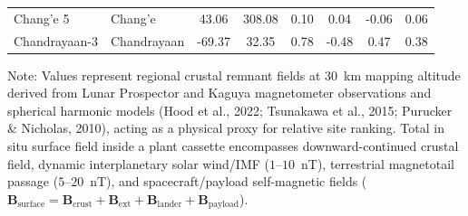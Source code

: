\begin{table}[t]
\begin{tabular*}{\textwidth}{@{\extracolsep\fill}llcccccc@{}}
\raggedright\footnotesize Chang'e 5 & \footnotesize Chang'e & \footnotesize 43.06 & \footnotesize 308.08 & \footnotesize 0.10 & \footnotesize 0.04 & \footnotesize -0.06 & \footnotesize 0.06 \\
\raggedright\footnotesize Chandrayaan-3 & \footnotesize Chandrayaan & \footnotesize -69.37 & \footnotesize 32.35 & \footnotesize 0.78 & \footnotesize -0.48 & \footnotesize 0.47 & \footnotesize 0.38 \\
\bottomrule
\end{tabular*}
\begin{tablenotes}
\item Note: Values represent regional crustal remnant fields at 30~km mapping altitude derived from Lunar Prospector and Kaguya magnetometer observations and spherical harmonic models (Hood et al., 2022; Tsunakawa et al., 2015; Purucker \& Nicholas, 2010), acting as a physical proxy for relative site ranking. Total in situ surface field inside a plant cassette encompasses downward-continued crustal field, dynamic interplanetary solar wind/IMF ($1$--$10$~nT), terrestrial magnetotail passage ($5$--$20$~nT), and spacecraft/payload self-magnetic fields ($\mathbf{B}_{\mathrm{surface}} = \mathbf{B}_{\mathrm{crust}} + \mathbf{B}_{\mathrm{ext}} + \mathbf{B}_{\mathrm{lander}} + \mathbf{B}_{\mathrm{payload}}$).
\end{tablenotes}
\end{table}
